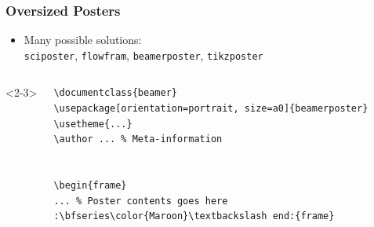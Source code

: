 \begin{frame}[fragile]
\frametitle{Oversized Posters}
\begin{itemize}
\item Many possible solutions:\\\texttt{sciposter}, \texttt{flowfram}, \alert<2-3>{\texttt{beamerposter}}, \alert<4-|trans:0|handout:0>{\texttt{tikzposter}}
\end{itemize}

\begin{columns}<2-3>
\begin{column}{.5\textwidth}
\begin{beamerboxesrounded}[width=\linewidth]{}
\begin{lstlisting}[basicstyle=\ttfamily\small,
moretexcs={usetheme,frametitle,frame},
emph={beamer,beamerposter,frame},
escapechar={:},lineskip=-2pt]
\documentclass{beamer}
\usepackage[orientation=portrait, size=a0]{beamerposter}
\usetheme{...}
\author ... % Meta-information


\begin{frame}
... % Poster contents goes here
:\bfseries\color{Maroon}\textbackslash end:{frame}


\end{lstlisting}
\end{beamerboxesrounded}
\end{column}
\end{columns}
\end{frame}
